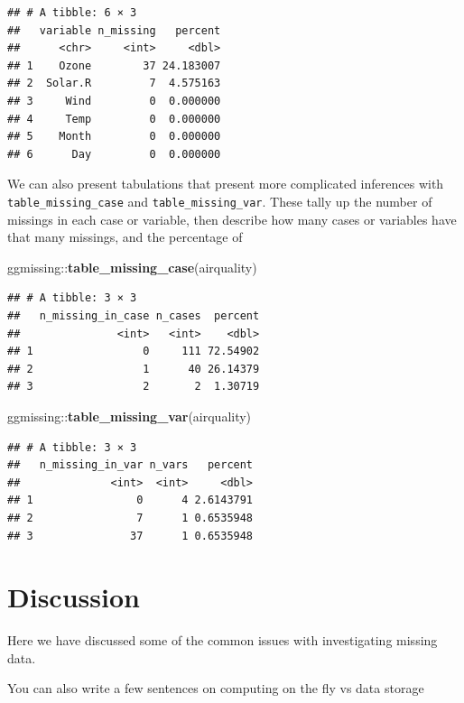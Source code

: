 \documentclass[]{article}
\newenvironment{Shaded}{\begin{snugshade}}{\end{snugshade}}
\newcommand{\KeywordTok}[1]{\textcolor[rgb]{0.13,0.29,0.53}{\textbf{{#1}}}}
\newcommand{\NormalTok}[1]{{#1}}
\begin{document}
\begin{verbatim}
## # A tibble: 6 × 3
##   variable n_missing   percent
##      <chr>     <int>     <dbl>
## 1    Ozone        37 24.183007
## 2  Solar.R         7  4.575163
## 3     Wind         0  0.000000
## 4     Temp         0  0.000000
## 5    Month         0  0.000000
## 6      Day         0  0.000000
\end{verbatim}

We can also present tabulations that present more complicated inferences
with \texttt{table\_missing\_case} and \texttt{table\_missing\_var}.
These tally up the number of missings in each case or variable, then
describe how many cases or variables have that many missings, and the
percentage of

\begin{Shaded}
\begin{Highlighting}[]
\NormalTok{ggmissing::}\KeywordTok{table_missing_case}\NormalTok{(airquality)}
\end{Highlighting}
\end{Shaded}

\begin{verbatim}
## # A tibble: 3 × 3
##   n_missing_in_case n_cases  percent
##               <int>   <int>    <dbl>
## 1                 0     111 72.54902
## 2                 1      40 26.14379
## 3                 2       2  1.30719
\end{verbatim}

\begin{Shaded}
\begin{Highlighting}[]
\NormalTok{ggmissing::}\KeywordTok{table_missing_var}\NormalTok{(airquality)}
\end{Highlighting}
\end{Shaded}

\begin{verbatim}
## # A tibble: 3 × 3
##   n_missing_in_var n_vars   percent
##              <int>  <int>     <dbl>
## 1                0      4 2.6143791
## 2                7      1 0.6535948
## 3               37      1 0.6535948
\end{verbatim}

\section{Discussion}\label{discussion}

Here we have discussed some of the common issues with investigating
missing data.

You can also write a few sentences on computing on the fly vs data
storage
\end{document}
